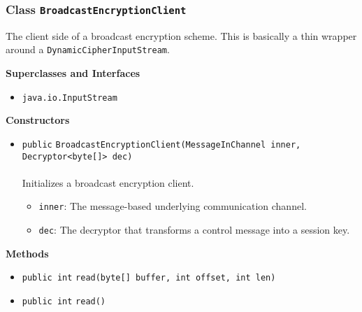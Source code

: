\subsubsection{Class \lstinline|BroadcastEncryptionClient|}
The client side of a broadcast encryption scheme. This is basically a thin
 wrapper around a \lstinline|DynamicCipherInputStream|. \\
\noindent\begin{minipage}[t]{5cm}
\vspace{0.3em}
\hspace*{2em}
\vspace{0.3em}
\end{minipage}



\textbf{\sffamily Superclasses and Interfaces}
\begin{itemize}
\item \lstinline|java.io.InputStream|
\end{itemize}


\textbf{\sffamily Constructors}
\begin{itemize}
\item \lstinline|public| \lstinline|BroadcastEncryptionClient|\lstinline|(MessageInChannel inner, Decryptor<byte[]> dec)|\\ \\[-0.6em]
Initializes a broadcast encryption client.
\begin{itemize}
\item \lstinline|inner|: The message-based underlying communication channel.
\item \lstinline|dec|: The decryptor that transforms a control message into
 a session key.
\end{itemize}



\end{itemize}


\textbf{\sffamily Methods}
\begin{itemize}
\item \lstinline|public int| \lstinline|read|\lstinline|(byte[] buffer, int offset, int len)| \\[-0.6em]




\item \lstinline|public int| \lstinline|read|\lstinline|()| \\[-0.6em]




\end{itemize}

